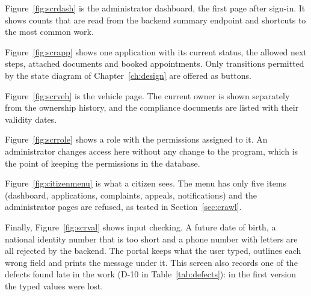 Figure~\ref{fig:scrdash} is the administrator dashboard, the first page after sign-in. It
shows counts that are read from the backend summary endpoint and shortcuts to the most
common work.

Figure~\ref{fig:scrapp} shows one application with its current status, the allowed next
steps, attached documents and booked appointments. Only transitions permitted by the
state diagram of Chapter~\ref{ch:design} are offered as buttons.

Figure~\ref{fig:scrveh} is the vehicle page. The current owner is shown separately from the
ownership history, and the compliance documents are listed with their validity dates.

Figure~\ref{fig:scrrole} shows a role with the permissions assigned to it. An administrator
changes access here without any change to the program, which is the point of keeping the
permissions in the database.

Figure~\ref{fig:citizenmenu} is what a citizen sees. The menu has only five items (dashboard,
applications, complaints, appeals, notifications) and the administrator pages are refused, as tested in Section~\ref{sec:crawl}.

Finally, Figure~\ref{fig:scrval} shows input checking. A future date of birth, a national
identity number that is too short and a phone number with letters are all rejected by the
backend. The portal keeps what the user typed, outlines each wrong field and prints the
message under it. This screen also records one of the defects found late in the work
(D-10 in Table~\ref{tab:defects}): in the first version the typed values were lost.

